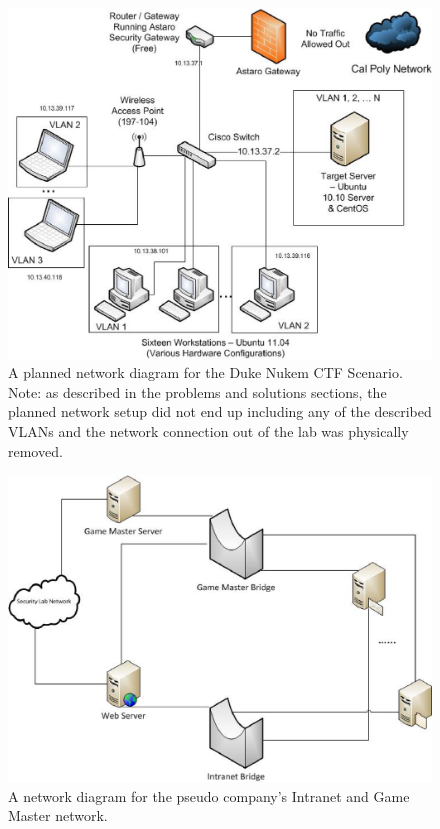 \documentclass[10pt]{article}
\begin{document}
\begin{figure}[here]
\includegraphics[scale=.50]{resources/dukenukem_network_diagram.eps}
\caption{A planned network diagram for the Duke Nukem CTF Scenario. Note: as
described in the problems and solutions sections, the planned network setup
did not end up including any of the described VLANs and the network connection
out of the lab was physically removed.}
\label{fig:dukeNetworkDiagram}
\end{figure}

\begin{figure}[here]
\includegraphics[scale=.75]{resources/dukenukem_intranet_diagram.eps}
\caption{A network diagram for the pseudo company's Intranet and Game Master
network.}
\label{fig:dukeNukemIntranetDiagram}
\end{figure}
\end{document}
